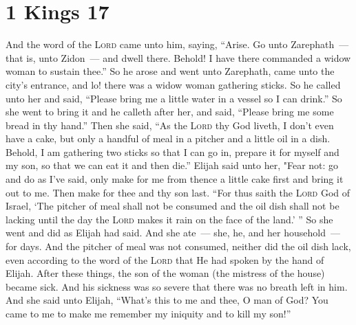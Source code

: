 \section{1 Kings 17}\label{1 Kings 17}
\begin{enumerate}[align=center]
     And the word of the \textsc{Lord} came unto him, saying,%
     ``Arise. Go unto Zarephath~--- that is, unto Zidon~--- and dwell there. Behold! I have there commanded a widow woman to sustain thee.''%
     So he arose and went unto Zarephath, came unto the city's entrance, and lo! there was a widow woman gathering sticks. So he called unto her and said, ``Please bring me a little water in a vessel so I can drink.''%
     So she went to bring it and he calleth after her, and said, ``Please bring me some bread in thy hand.''%
     Then she said, ``As the \textsc{Lord} thy God liveth, I don't even have a cake, but only a handful of meal in a pitcher and a little oil in a dish. Behold, I am gathering two sticks so that I can go in, prepare it for myself and my son, so that we can eat it and then die.''%
     Elijah said unto her, "Fear not: go and do as I've said, only make for me from thence a little cake first and bring it out to me. Then make for thee and thy son last.%
     ``For thus saith the \textsc{Lord} God of Israel, `The pitcher of meal shall not be consumed and the oil dish shall not be lacking until the day the \textsc{Lord} makes it rain on the face of the land.' ''%
     So she went and did as Elijah had said. And she ate~--- she, he, and her household~--- for days.%
     And the pitcher of meal was not consumed, neither did the oil dish lack, even according to the word of the \textsc{Lord} that He had spoken by the hand of Elijah.%
     After these things, the son of the woman (the mistress of the house) became sick. And his sickness was so severe that there was no breath left in him.%
     And she said unto Elijah, ``What's this to me and thee, O man of God? You came to me to make me remember my iniquity and to kill my son!''%

\end{enumerate}
